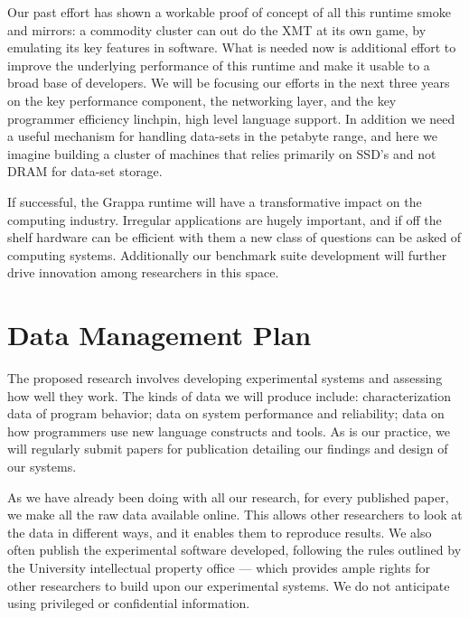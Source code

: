 Our past effort has shown a workable proof of concept of all this runtime smoke and mirrors: a commodity cluster can out do the XMT at its own game, by emulating its key features in software.  What is needed now is additional effort to improve the underlying performance of this runtime and make it usable to a broad base of developers.  We will be focusing our efforts in the next three years on the key performance component, the networking layer, and the key programmer efficiency linchpin, high level language support.  In addition we need a useful mechanism for handling data-sets in the petabyte range, and here we imagine building a cluster of machines that relies primarily on SSD's and not DRAM for data-set storage.

If successful, the Grappa runtime will have a transformative impact on the computing industry.  Irregular applications are hugely important, and if off the shelf hardware can be efficient with them a new class of questions can be asked of computing systems.  Additionally our benchmark suite development will further drive innovation among researchers in this space.



\newpage

\section*{Data Management Plan}

The proposed research involves developing experimental systems and
assessing how well they work. The kinds of data we will produce
include: characterization data of program behavior; data on system
performance and reliability; data on how programmers use new language
constructs and tools. As is our practice, we will regularly submit
papers for publication detailing our findings and design of our
systems.

As we have already been doing with all our research, for every
published paper, we make all the raw data available online. This
allows other researchers to look at the data in different ways, and it
enables them to reproduce results. We also often publish
the experimental software developed, following the rules outlined by
the University intellectual property office --- which provides ample
rights for other researchers to build upon our experimental
systems. We do not anticipate using privileged or confidential
information. 


